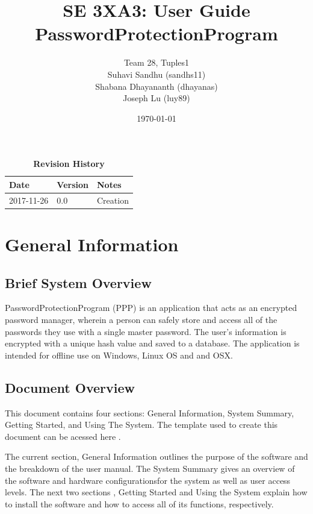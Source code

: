 \documentclass[12pt, titlepage]{article}
\title{SE 3XA3: User Guide\\PasswordProtectionProgram}
\author{Team 28, Tuples1
		\\ Suhavi Sandhu (sandhs11)
		\\ Shabana Dhayananth (dhayanas)
		\\ Joseph Lu (luy89)
}
\date{\today}
\begin{document}
\maketitle

\tableofcontents
\listoftables
\listoffigures

\begin{table}[bp]
\caption{\bf Revision History}
\begin{tabularx}{\textwidth}{p{3cm}p{2cm}X}
\toprule {\bf Date} & {\bf Version} & {\bf Notes}\\
\midrule
2017-11-26 & 0.0 & Creation\\
\bottomrule
\end{tabularx}
\end{table}

\newpage


\section{General Information}\label{Intro}

\subsection{Brief System Overview} \label{ProjOver}
PasswordProtectionProgram (PPP) is an application that acts as an encrypted password manager, wherein a person can safely store and access all of the passwords they use with a single master password. The user's information is encrypted with a unique hash value and saved to a database. The application is intended for offline use on Windows, Linux OS and and OSX.

\subsection{Document Overview} \label{DocOver}
This document contains four sections: General Information, System Summary, Getting Started, and Using The System. The template used to create this document can be acessed here \cite{TEMPLATE:1}.

The current section, General Information outlines the purpose of the software and the breakdown of the user manual. The System Summary gives an overview of the software and hardware configurationsfor the system as well as user access levels. The next two sections , Getting Started and Using the System explain how to install the software and how to access all of its functions, respectively.
\end{document}
